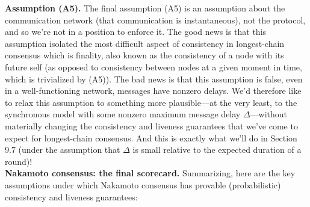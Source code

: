 \noindent
\textbf{Assumption (A5).} The final assumption (A5) is an assumption about the communication
network (that communication is instantaneous), not the protocol, and so we’re not in a
position to enforce it. The good news is that this assumption isolated the most difficult
aspect of consistency in longest-chain consensus which is finality, also known as the consistency of a node
with its future self (as opposed to consistency between nodes at a given moment in time,
which is trivialized by (A5)). The bad news is that this assumption is false, even
in a well-functioning network, messages have nonzero delays. We’d therefore like to relax
this assumption to something more plausible—at the very least, to the synchronous model
with some nonzero maximum message delay $\Delta$—without materially changing the consistency
and liveness guarantees that we've come to expect for longest-chain consensus. And this is
exactly what we’ll do in Section 9.7 (under the assumption that $\Delta$ is small relative to the
expected duration of a round)!\\

\noindent
\textbf{Nakamoto consensus: the final scorecard.} Summarizing, here are the key assumptions under which Nakamoto consensus has provable (probabilistic) consistency and liveness
guarantees:

